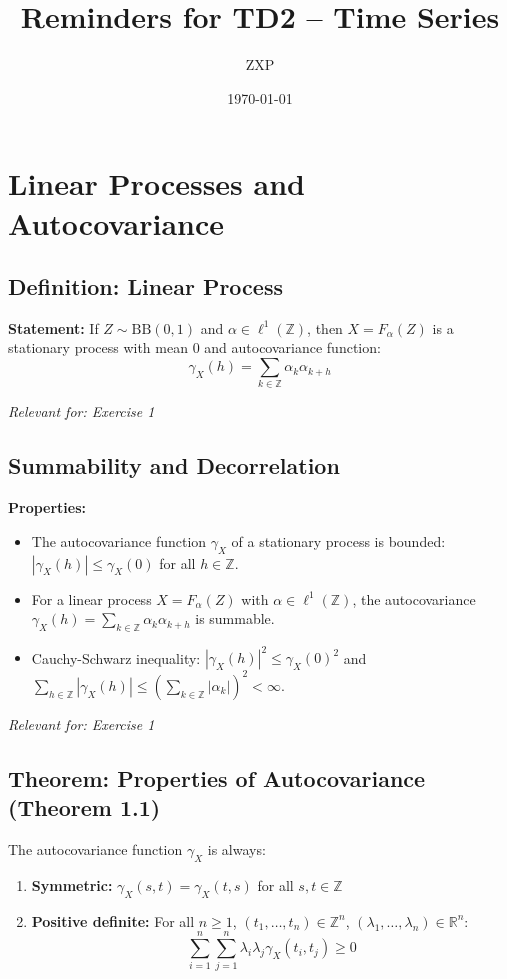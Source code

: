 \documentclass[a4paper, 12pt]{article}
\title{Reminders for TD2 -- Time Series}
\date{\today}
\author{ZXP}
\begin{document}
\maketitle

\section{Linear Processes and Autocovariance}

\subsection{Definition: Linear Process}
\textbf{Statement:} If $Z \sim \text{BB}(0,1)$ and $\alpha \in \ell^1(\mathbb{Z})$, then $X = F_\alpha(Z)$ is a stationary process with mean 0 and autocovariance function:
\[
\gamma_X(h) = \sum_{k \in \mathbb{Z}} \alpha_k \alpha_{k+h}
\]

\textit{Relevant for: Exercise 1}

\subsection{Summability and Decorrelation}
\textbf{Properties:}
\begin{itemize}
\item The autocovariance function $\gamma_X$ of a stationary process is bounded: $|\gamma_X(h)| \leq \gamma_X(0)$ for all $h \in \mathbb{Z}$.
\item For a linear process $X = F_\alpha(Z)$ with $\alpha \in \ell^1(\mathbb{Z})$, the autocovariance $\gamma_X(h) = \sum_{k \in \mathbb{Z}} \alpha_k \alpha_{k+h}$ is summable.
\item Cauchy-Schwarz inequality: $|\gamma_X(h)|^2 \leq \gamma_X(0)^2$ and $\sum_{h \in \mathbb{Z}} |\gamma_X(h)| \leq \left(\sum_{k \in \mathbb{Z}} |\alpha_k|\right)^2 < \infty$.
\end{itemize}

\textit{Relevant for: Exercise 1}

\subsection{Theorem: Properties of Autocovariance (Theorem 1.1)}
The autocovariance function $\gamma_X$ is always:
\begin{enumerate}
\item \textbf{Symmetric:} $\gamma_X(s,t) = \gamma_X(t,s)$ for all $s,t \in \mathbb{Z}$
\item \textbf{Positive definite:} For all $n \geq 1$, $(t_1,\ldots,t_n) \in \mathbb{Z}^n$, $(\lambda_1,\ldots,\lambda_n) \in \mathbb{R}^n$:
\[
\sum_{i=1}^n \sum_{j=1}^n \lambda_i\lambda_j\gamma_X(t_i,t_j) \geq 0
\]
\end{enumerate}
\end{document}
